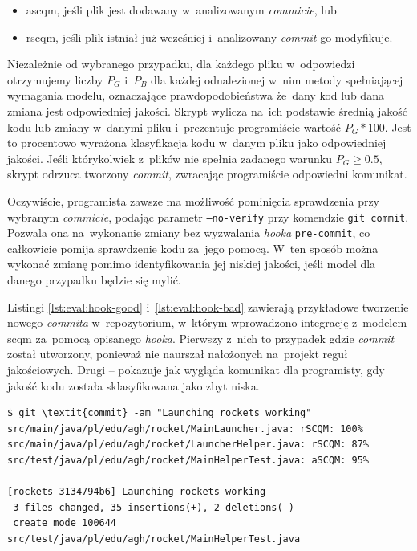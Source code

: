 \documentclass[twoside]{praca}
\begin{document}
\begin{itemize}
    \item \gls{ascqm}, jeśli plik jest dodawany w~analizowanym \textit{commicie}, lub
    \item \gls{rscqm}, jeśli plik istniał już wcześniej i~analizowany \textit{commit} go modyfikuje.
\end{itemize}

Niezależnie od wybranego przypadku, dla każdego pliku w~odpowiedzi otrzymujemy liczby $P_G$ i~$P_B$ dla każdej odnalezionej w~nim metody spełniającej wymagania modelu, oznaczające prawdopodobieństwa że~dany kod lub dana zmiana jest odpowiedniej jakości. Skrypt wylicza na~ich podstawie średnią jakość kodu lub zmiany w~danymi pliku i~prezentuje programiście wartość $P_G*100$. Jest to procentowo wyrażona klasyfikacja kodu w~danym pliku jako odpowiedniej jakości. Jeśli którykolwiek z~plików nie spełnia zadanego warunku $P_G\geq0.5$, skrypt odrzuca tworzony \textit{commit}, zwracając programiście odpowiedni komunikat.

Oczywiście, programista zawsze ma możliwość pominięcia sprawdzenia przy wybranym \textit{commicie}, podając parametr \texttt{--no-verify} przy komendzie \texttt{git commit}. Pozwala ona na~wykonanie zmiany bez wyzwalania \textit{hooka} \texttt{pre-commit}, co całkowicie pomija sprawdzenie kodu za~jego pomocą. W~ten sposób można wykonać zmianę pomimo identyfikowania jej niskiej jakości, jeśli model dla danego przypadku będzie się mylić.

Listingi \ref{lst:eval:hook-good} i~\ref{lst:eval:hook-bad} zawierają przykładowe tworzenie nowego \textit{commita} w~repozytorium, w~którym wprowadzono integrację z~modelem \gls{scqm} za~pomocą opisanego \textit{hooka}. Pierwszy z~nich to przypadek gdzie \textit{commit} został utworzony, ponieważ nie naurszał nałożonych na~projekt reguł jakościowych. Drugi -- pokazuje jak wygląda komunikat dla programisty, gdy jakość kodu została sklasyfikowana jako zbyt niska.

\begin{lstlisting}[frame=single,caption={Próba wprowadzenia zmiany kodu odpowiedniej jakości wraz z~informacją pochodzącą z~hooka integrującego projekt z~SCQM},captionpos=b,label={lst:eval:hook-good}]
$ git \textit{commit} -am "Launching rockets working"
src/main/java/pl/edu/agh/rocket/MainLauncher.java: rSCQM: 100%
src/main/java/pl/edu/agh/rocket/LauncherHelper.java: rSCQM: 87%
src/test/java/pl/edu/agh/rocket/MainHelperTest.java: aSCQM: 95%

[rockets 3134794b6] Launching rockets working
 3 files changed, 35 insertions(+), 2 deletions(-)
 create mode 100644 src/test/java/pl/edu/agh/rocket/MainHelperTest.java
\end{lstlisting}
\end{document}
